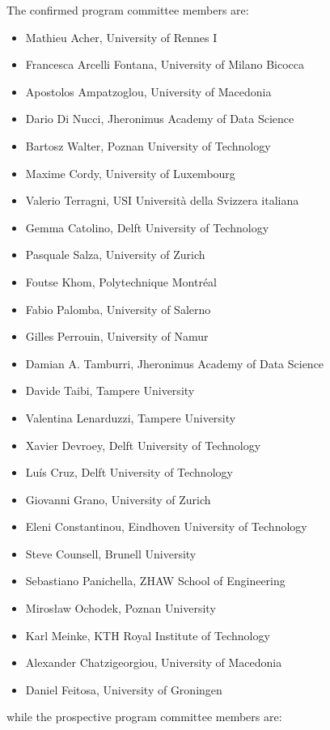 \medskip
\noindent The confirmed program committee members are:
\begin{itemize}[topsep=0.5em, itemsep=0.5em]
	\item Mathieu Acher, University of Rennes I
	\item Francesca Arcelli Fontana, University of  Milano Bicocca
	\item Apostolos Ampatzoglou, University of Macedonia
	\item Dario Di Nucci, Jheronimus Academy of Data Science
	\item Bartosz Walter, Poznan University of Technology
	\item Maxime Cordy, University of Luxembourg
	\item Valerio Terragni, USI Università della Svizzera italiana
	\item Gemma Catolino, Delft University of Technology
	\item Pasquale Salza, University of Zurich
	\item Foutse Khom, Polytechnique Montréal
	\item Fabio Palomba, University of Salerno
	\item Gilles Perrouin, University of Namur
	\item Damian A. Tamburri, Jheronimus Academy of Data Science
	\item Davide Taibi, Tampere University
	\item Valentina Lenarduzzi, Tampere University
	\item Xavier Devroey, Delft University of Technology
	\item Luís Cruz, Delft University of Technology
	\item Giovanni Grano, University of Zurich
	\item Eleni Constantinou, Eindhoven University of Technology
	\item Steve Counsell, Brunell University
	\item Sebastiano Panichella, ZHAW School of Engineering
	\item Mirosław Ochodek, Poznan University
	\item Karl Meinke, KTH Royal Institute of Technology
	\item Alexander Chatzigeorgiou, University of Macedonia
	\item Daniel Feitosa, University of Groningen
\end{itemize}

\smallskip
\noindent while the prospective program committee members are:

